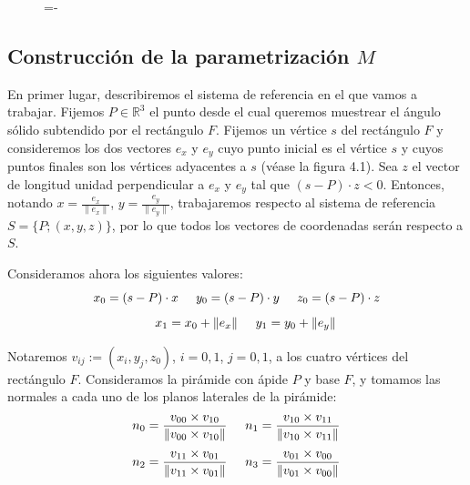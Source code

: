 \begin{figure}[h]
  \lineskip=-\fboxrule
\end{figure}

\subsection{Construcción de la parametrización $M$ }

En primer lugar, describiremos el sistema de referencia en el que vamos a trabajar. Fijemos $P\in\mathds{R}^3$ el punto desde el cual queremos muestrear el ángulo sólido subtendido por el rectángulo $F$. Fijemos un vértice $s$ del rectángulo $F$ y consideremos los dos vectores $e_x$ y $e_y$ cuyo punto inicial es el vértice $s$ y cuyos puntos finales son los vértices adyacentes a $s$ (véase la figura 4.1). Sea $z$ el vector de longitud unidad perpendicular a $e_x$ y $e_y$ tal que $(s-P)\cdot z < 0$. Entonces, notando $x=\frac{e_x}{\|e_x\|}$, $y=\frac{e_y}{\|e_y\|}$, trabajaremos respecto al sistema de referencia $S=\{P; (x, y, z)\}$, por lo que todos los vectores de coordenadas serán respecto a $S$.

Consideramos ahora los siguientes valores:
$$ x_0 = (s-P)\cdot x\hspace{0.5cm}y_0 = (s-P)\cdot y\hspace{0.5cm}z_0 = (s-P)\cdot z$$
$$\hspace{0.5cm}x_1 = x_0+\|e_x\|\hspace{0.5cm}y_1 = y_0+\|e_y\|$$

Notaremos $v_{ij} := (x_i,y_j,z_0)$, $i=0,1$, $j=0,1$, a los cuatro vértices del rectángulo $F$. Consideramos la pirámide con ápide $P$ y base $F$, y tomamos las normales a cada uno de los planos laterales de la pirámide:
$$ n_0 = \frac{v_{00}\times v_{10}}{\|v_{00}\times v_{10}\|}\hspace{0.5cm}n_1 = \frac{v_{10}\times v_{11}}{\|v_{10}\times v_{11}\|}$$
$$ n_2 = \frac{v_{11}\times v_{01}}{\|v_{11}\times v_{01}\|}\hspace{0.5cm}n_3 = \frac{v_{01}\times v_{00}}{\|v_{01}\times v_{00}\|}$$

